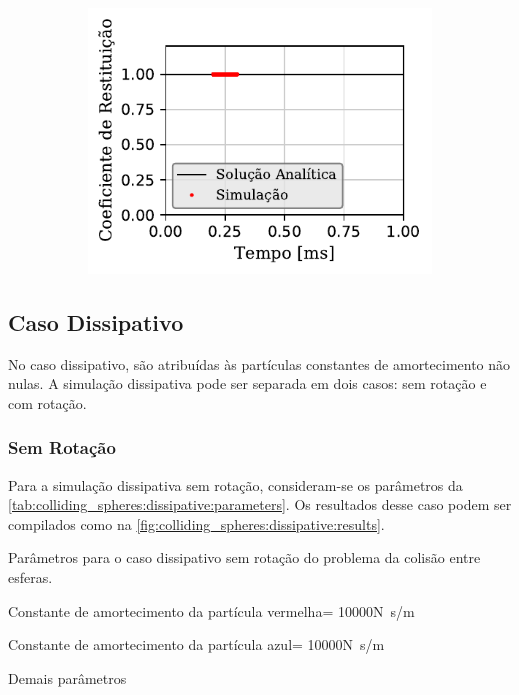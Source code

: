 \begin{figure}[H]
{\begin{subfigure}[t]{\smallresultsfigwidth}
			\includegraphics[scale=1]{images/colliding_spheres/conservative/coefficient_of_restitution_small.pdf}
			\caption{}
			\label{subfig:colliding_spheres:conservative:coefficient_of_restitution}
		\end{subfigure}
	}
	\label{fig:colliding_spheres:conservative:results}
	\sourceMe
\end{figure}

\subsection{Caso Dissipativo} \label{sec:colliding_spheres:dissipative}

No caso dissipativo, são atribuídas às partículas constantes de amortecimento não nulas. A simulação dissipativa pode ser separada em dois casos: sem rotação e com rotação.

\subsubsection{Sem Rotação}

Para a simulação dissipativa sem rotação, consideram-se os parâmetros da \cref{tab:colliding_spheres:dissipative:parameters}. Os resultados desse caso podem ser compilados como na \cref{fig:colliding_spheres:dissipative:results}.

\begin{table}[htb!]
\centering
\caption{Parâmetros para o caso dissipativo sem rotação do problema da colisão entre esferas.}
\label{tab:colliding_spheres:dissipative:parameters}
\begin{parametersdesc}{0.9\textwidth}
	\item{Constante de amortecimento da partícula vermelha}{\redNormalDampingConstant = 10000}{\si[per-mode=symbol]{\newton\second\per\meter}}
	\item{Constante de amortecimento da partícula azul}{\blueNormalDampingConstant = 10000}{\si[per-mode=symbol]{\newton\second\per\meter}}
	\item{Demais parâmetros}{}{}
\end{parametersdesc}
\sourceMe 
\end{table}

